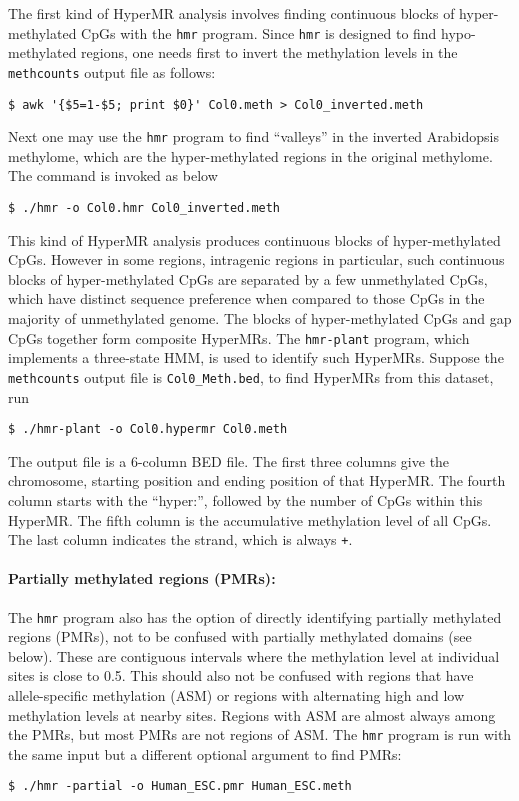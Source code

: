 \documentclass[10pt]{article}
\newcommand{\prog}[1]{\texttt{#1}}
\newcommand{\fn}[1]{\texttt{#1}}
\newcommand{\lit}[1]{\texttt{#1}}
\begin{document}
The first kind of HyperMR analysis involves finding continuous blocks
of hyper-methylated CpGs with the \prog{hmr} program. Since \prog{hmr}
is designed to find hypo-methylated regions, one needs first to invert
the methylation levels in the \prog{methcounts} output file as
follows:
\begin{verbatim}
$ awk '{$5=1-$5; print $0}' Col0.meth > Col0_inverted.meth
\end{verbatim}
Next one may use the \prog{hmr} program to find ``valleys'' in the
inverted Arabidopsis methylome, which are the hyper-methylated regions
in the original methylome. The command is invoked as below
\begin{verbatim}
$ ./hmr -o Col0.hmr Col0_inverted.meth
\end{verbatim}

This kind of HyperMR analysis produces continuous blocks of
hyper-methylated CpGs. However in some regions, intragenic regions in
particular, such continuous blocks of hyper-methylated CpGs are
separated by a few unmethylated CpGs, which have distinct sequence
preference when compared to those CpGs in the majority of unmethylated
genome. The blocks of hyper-methylated CpGs and gap CpGs together form
composite HyperMRs. The \prog{hmr-plant} program, which implements a
three-state HMM, is used to identify such HyperMRs. Suppose the
\prog{methcounts} output file is \fn{Col0\_Meth.bed}, to find HyperMRs
from this dataset, run
\begin{verbatim}
$ ./hmr-plant -o Col0.hypermr Col0.meth
\end{verbatim}
The output file is a 6-column BED file. The first three columns give
the chromosome, starting position and ending position of that
HyperMR. The fourth column starts with the ``hyper:'', followed by the
number of CpGs within this HyperMR. The fifth column is the
accumulative methylation level of all CpGs. The last column indicates
the strand, which is always \lit{+}.

\paragraph{Partially methylated regions (PMRs):}
The \prog{hmr} program also has the option of directly identifying
partially methylated regions (PMRs), not to be confused with partially
methylated domains (see below). These are contiguous intervals where
the methylation level at individual sites is close to 0.5. This should
also not be confused with regions that have allele-specific
methylation (ASM) or regions with alternating high and low methylation
levels at nearby sites. Regions with ASM are almost always among the
PMRs, but most PMRs are not regions of ASM. The \prog{hmr} program is
run with the same input but a different optional argument to find
PMRs:
\begin{verbatim}
$ ./hmr -partial -o Human_ESC.pmr Human_ESC.meth
\end{verbatim}
\end{document}
